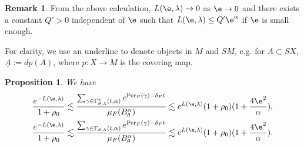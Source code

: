 \documentclass[11pt]{amsart}
\newtheorem{proposition}[theorem]{Proposition}
\theoremstyle{definition}
\newtheorem{remark}[theorem]{Remark}
\def\a{\alpha}
\def\c{\gamma}   \def\C{\Gamma}
\def\d{\delta}   %
\def\l{\lambda}   \def\L{\Lambda}
\newcommand{\Per}{\mathrm{Per}}
\begin{document}
\begin{remark}\label{constant}
From the above calculation, $L(\e,\l)\to 0$ as $\e\to 0$ and there exists a constant $Q'>0$ independent of $\e$ such that $L(\e,\l)\le Q'\e^\a$ if $\e$ is small enough.
\end{remark}

For clarity, we use an underline to denote objects in $M$ and $SM$, e.g. for $A\subset SX$, $\underline A:=dp(A)$, where $p: X\to M$ is the covering map.

\begin{proposition}\label{asymptotic}
We have
\begin{equation*}
\begin{aligned}
\frac{e^{-L(\e,\l)}}{1+\rho_0}& \lesssim \frac{\sum_{\c\in \C^*_{\theta,\L}(t,\a)}e^{\Per_F(\c)-\d_Ft}}{\mu_F(B_\theta^\a)} \lesssim e^{L(\e,\l)}(1+\rho_0)(1+\frac{4\e^2}{\a}),\\
\frac{e^{-L(\e,\l)}}{1+\rho_0}& \lesssim \frac{\sum_{\c\in \C_{\theta,\L}(t,\a)}e^{\Per_F(\c)-\d_Ft}}{\mu_F(B_\theta^\a)} \lesssim e^{L(\e,\l)}(1+\rho_0)(1+\frac{4\e^2}{\a}).
\end{aligned}
\end{equation*}
\end{proposition}
\end{document}
